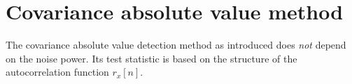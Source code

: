 \documentclass[a4paper, openany, oneside]{memoir}
\begin{document}





\section{Covariance absolute value method}
The covariance absolute value detection method as introduced does \emph{not} depend on the noise power. Its test statistic is based on the structure of the autocorrelation function $r_x[n]$. 
\end{document}
